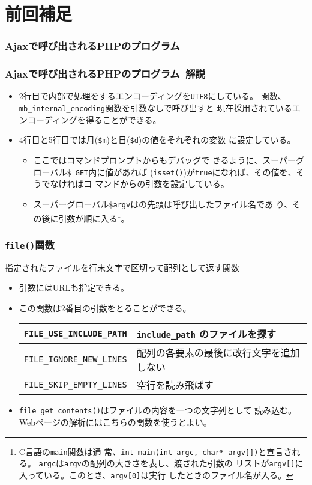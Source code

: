  \section{前回補足}
\begin{frame}[containsverbatim]
\frametitle{Ajaxで呼び出されるPHPのプログラム}
\end{frame}
\begin{frame}[containsverbatim]
\frametitle{Ajaxで呼び出されるPHPのプログラム--解説}
\begin{itemize}
 \item 2行目で内部で処理をするエンコーディングを\texttt{UTF8}にしている。
       関数、\texttt{mb\_internal\_encoding}関数を引数なしで呼び出すと
       現在採用されているエンコーディングを得ることができる。
 \item 4行目と5行目では月(\verb+$m+)と日(\verb+$d+)の値をそれぞれの変数
       に設定している。
\begin{itemize}
 \item ここではコマンドプロンプトからもデバッグで
       きるように、スーパーグローバル\verb+$_GET+内に値があれば
       (\Verb+isset()+)が\Verb+true+になれば、その値を、そうでなければコ
       マンドからの引数を設定している。
 \item スーパーグローバル\verb+$argv+はの先頭は呼び出したファイル名であ
       り、その後に引数が順に入る\footnote{C言語の\texttt{main}関数は通
       常、\texttt{int main(int argc, char* argv[])}と宣言される。%
       \texttt{argc}は\texttt{argv}の配列の大きさを表し、渡された引数の
       リストが\texttt{argv[]}に入っている。このとき、\texttt{argv[0]}は実行
       したときのファイル名が入る。}。
\end{itemize}
\end{itemize}
\end{frame}
\begin{frame}[containsverbatim]
\frametitle{\texttt{file()}関数}
指定されたファイルを行末文字で区切って配列として返す関数\\
\begin{itemize}
\item 引数にはURLも指定できる。
\item この関数は2番目の引数をとることができる。
\begin{center}
 \begin{tabular}{|c|m{}|}\hline
 \Verb+FILE_USE_INCLUDE_PATH+ & \Verb+include_path+ のファイルを探す\\\hline
 \Verb+FILE_IGNORE_NEW_LINES+ & 配列の各要素の最後に改行文字を追加しない
      \\ \hline
  \Verb+FILE_SKIP_EMPTY_LINES+&空行を読み飛ばす \\ \hline
 \end{tabular}
\end{center}
 \item \verb+file_get_contents()+はファイルの内容を一つの文字列として
       読み込む。Webページの解析にはこちらの関数を使うとよい。
\end{itemize}
\end{frame}
